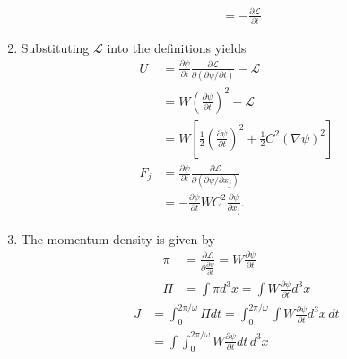 \documentclass[../main.tex]{subfiles}
\begin{document}
\begin{enumerate}[label=(\alph*)]
\begin{align}
    &=-\frac{\partial\mathcal{L}}{\partial t}
\end{align}
\item Substituting $\mathcal{L}$ into the definitions yields
\begin{align}
    U&=\frac{\partial\psi}{\partial t}\frac{\partial\mathcal{L}}{\partial(\partial\psi/\partial t)}-\mathcal{L}\\
    &=W\left(\frac{\partial\psi}{\partial t}\right)^2-\mathcal{L}\\
    &=W\left[\frac{1}{2}\left(\frac{\partial\psi}{\partial t}\right)^2+\frac{1}{2}C^2\left(\nabla\psi\right)^2\right]\\
    F_j&=\frac{\partial\psi}{\partial t}\frac{\partial\mathcal{L}}{\partial(\partial\psi/\partial x_j)}\\
    &=-\frac{\partial\psi}{\partial t} W C^2\frac{\partial\psi}{\partial x_j}.
\end{align}
\item The momentum density is given by
\begin{align}
    \pi
    &=\frac{\partial\mathcal{L}}{\partial\frac{\partial\psi}{\partial t}}=W\frac{\partial\psi}{\partial t}\\
    \Pi&=\int\pi d^3x=\int W\frac{\partial\psi}{\partial t}d^3x
\end{align}
\begin{align}
    J&=\int_0^{2\pi/\omega}\Pi dt=\int_0^{2\pi/\omega}\int W\frac{\partial\psi}{\partial t} d^3x\,dt\\
    &=\int \int_0^{2\pi/\omega}W \frac{\partial\psi}{\partial t} dt\,d^3x\\
\end{align}
\end{enumerate}
\end{document}
